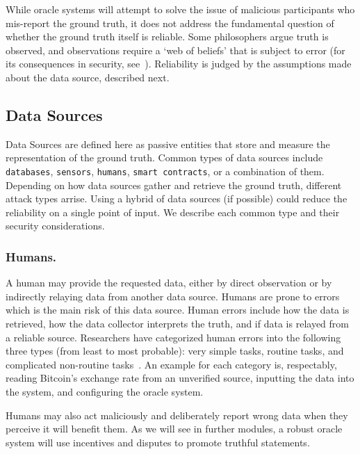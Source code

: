 While oracle systems will attempt to solve the issue of malicious participants who mis-report the ground truth, it does not address the fundamental question of whether the ground truth itself is reliable. Some philosophers argue truth is observed, and observations require a `web of beliefs' that is subject to error (for its consequences in security, see~\cite{HvO17}). Reliability is judged by the assumptions made about the data source, described next. 


\subsection{Data Sources}\label{data_sources}

Data Sources are defined here as passive entities that store and measure the representation of the ground truth. Common types of data sources include \texttt{databases}, \texttt{sensors}, \texttt{humans}, \texttt{smart contracts}, or a combination of them. Depending on how data sources gather and retrieve the ground truth, different attack types arrise. Using a hybrid of data sources (if possible) could reduce the reliability on a single point of input. We describe each common type and their security considerations.

\subsubsection{Humans.}\label{humansDatasource}
A human may provide the requested data, either by direct observation or by indirectly relaying data from another data source. Humans are prone to errors which is the main risk of this data source. Human errors include how the data is retrieved, how the data collector interprets the truth, and if data is relayed from a reliable source. Researchers have categorized human errors into the following three types (from least to most probable): very simple tasks, routine tasks, and complicated non-routine tasks~\cite{lo2020reliability}. An example for each category is, respectably, reading Bitcoin's exchange rate from an unverified source, inputting the data into the system, and configuring the oracle system.

Humans may also act maliciously and deliberately report wrong data when they perceive it will benefit them. As we will see in further modules, a robust oracle system will use incentives and disputes to promote truthful statements. 


